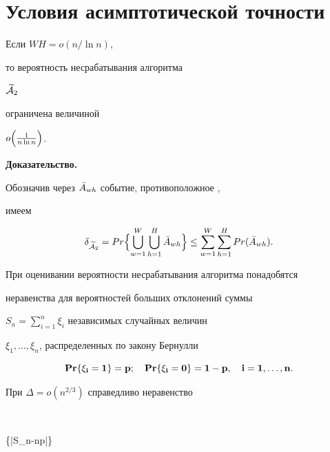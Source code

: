 \section{Условия асимптотической точности}





\begin{lem} 


\label{lm1}


Если $WH=o(n/ \ln n)$, 


то вероятность несрабатывания алгоритма


$\widetilde {\cal A}_{2}$


ограничена величиной


$o\Bigl(\frac {1}{n \ln n}\Bigr)$.


\end{lem}





{\bf Доказательство.}


Обозначив через $\Bar {A}_{wh}$ событие, противоположное ,


имеем


$$


\delta_{\widetilde{\cal A}_{2}}=Pr \Bigl\{


\bigcup\MW \bigcup\MH \Bar {A}_{wh} 


\Bigr \} \le \SWH Pr(\Bar {A}_{wh}).


$$





При оценивании вероятности несрабатывания алгоритма понадобятся


неравенства для вероятностей больших отклонений суммы 


$S_{n}=\sum\limits_{i=1}^{n} \xi_{i} $ независимых случайных величин


$\xi_{1},\dotsc,\xi_{n}$, распределенных по закону Бернулли


$$ 


\PR \{\xi_{i}=1\} =p;\quad


\PR \{\xi_{i}=0\} =1-p,\quad i=1,\dotsc,n.


$$





При $\Delta = o(n^{2/3})$ справедливо неравенство \cite{GZ}


$$


\PR \{|S_{n}-np|\ge \Delta\} 



